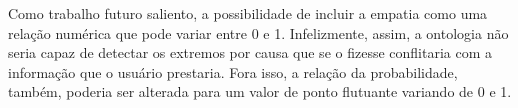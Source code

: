 Como trabalho futuro saliento, a possibilidade de incluir a empatia como uma
relação numérica que pode variar entre 0 e 1. Infelizmente, assim, a ontologia
não seria capaz de detectar os extremos por causa que se o fizesse conflitaria
com a informação que o usuário prestaria. Fora isso, a relação da
probabilidade, também, poderia ser alterada para um valor de ponto flutuante
variando de 0 e 1.


